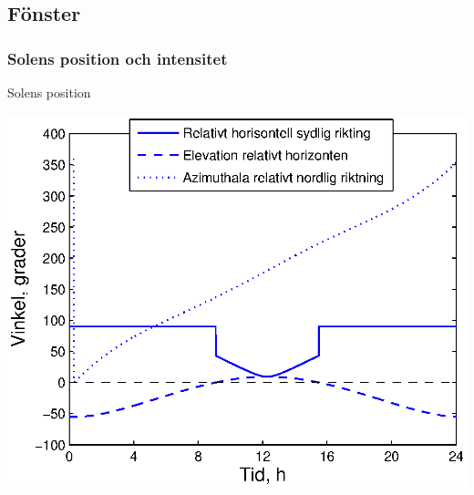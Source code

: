 \subsection{Fönster}

\subsubsection{Solens position och intensitet}
\begin{frame}{Solens position}
  \begin{center}
  \includegraphics[scale=0.8]{images/sunposition1231.eps}
  \end{center}
\end{frame}

